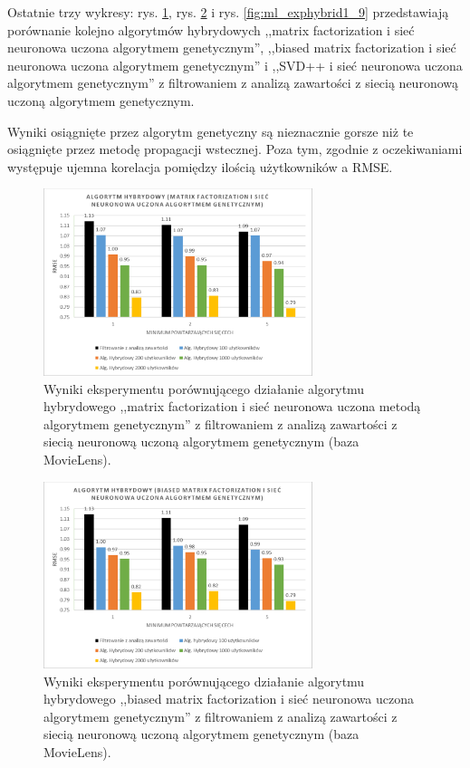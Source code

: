 \documentclass[twoside]{iisthesis}
\begin{document}
		Ostatnie trzy wykresy: rys. \ref{fig:ml_exphybrid1_7}, rys. \ref{fig:ml_exphybrid1_8} i rys. \ref{fig:ml_exphybrid1_9} przedstawiają porównanie kolejno algorytmów hybrydowych ,,matrix factorization i sieć neuronowa uczona algorytmem genetycznym'', ,,biased matrix factorization i sieć neuronowa uczona algorytmem genetycznym'' i ,,SVD++ i sieć neuronowa uczona algorytmem genetycznym'' z filtrowaniem z analizą zawartości z siecią neuronową uczoną algorytmem genetycznym.
		
		Wyniki osiągnięte przez algorytm genetyczny są nieznacznie gorsze niż te osiągnięte przez metodę propagacji wstecznej. Poza tym, zgodnie z oczekiwaniami występuje ujemna korelacja pomiędzy ilością użytkowników a RMSE.
		
			\begin{figure}
			\centering
			\includegraphics[width=0.7\textwidth]{ml_exphybrid1_7}			
			\caption{Wyniki eksperymentu porównującego działanie algorytmu hybrydowego ,,matrix factorization i sieć neuronowa uczona metodą algorytmem genetycznym'' z filtrowaniem z analizą zawartości z siecią neuronową uczoną algorytmem genetycznym (baza MovieLens).}
			\label{fig:ml_exphybrid1_7}
		\end{figure}
		
		\begin{figure}
			\centering
			\includegraphics[width=0.7\textwidth]{ml_exphybrid1_8}			
			\caption{Wyniki eksperymentu porównującego działanie algorytmu hybrydowego ,,biased matrix factorization i sieć neuronowa uczona algorytmem genetycznym'' z filtrowaniem z analizą zawartości z siecią neuronową uczoną algorytmem genetycznym (baza MovieLens).}
			\label{fig:ml_exphybrid1_8}
		\end{figure}
		
\end{document}
